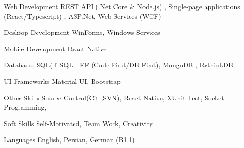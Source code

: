 


\begin{cvskills}


\cvskill
{Web Development} %
{REST API (.Net Core \& Node.js) , Single-page applications (React/Typescript) , ASP.Net, Web Services (WCF)} %

\cvskill
{Desktop Development}
{WinForms, Windows Services}


\cvskill
{Mobile Development}
{React Native}

\cvskill
{Databases} %
{SQL(T-SQL - EF (Code First/DB First), MongoDB , RethinkDB} %

\cvskill
{UI Frameworks} %
{Material UI, Bootstrap} %


\cvskill
{Other Skills} %
{Source Control(Git ,SVN), React Native, XUnit Test, Socket Programming,  } %



\cvskill
{Soft Skills} %
{Self-Motivated, Team Work, Creativity  } %

\cvskill
{Languages} %
{English, Persian, German (B1.1)} %


\end{cvskills}
